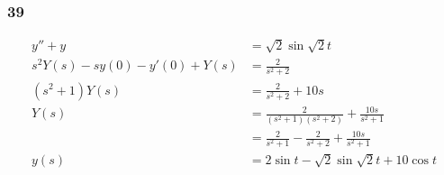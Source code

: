 \documentclass{article}
\begin{document}
\subsubsection{39}

\begin{align*}
  y'' + y                          & = \sqrt{2} \sin \sqrt{2} t                                     \\
  s^2 Y(s) - s y(0) - y'(0) + Y(s) & = \frac{2}{s^2 + 2}                                            \\
  (s^2 + 1) Y(s)                   & = \frac{2}{s^2 + 2} + 10 s                                     \\
  Y(s)                             & = \frac{2}{(s^2 + 1) (s^2 + 2)} + \frac{10 s}{s^2 + 1}         \\
                                   & = \frac{2}{s^2 + 1} - \frac{2}{s^2 + 2} + \frac{10 s}{s^2 + 1} \\
  y(s)                             & = 2 \sin t - \sqrt{2} \sin \sqrt{2} t + 10 \cos t
\end{align*}
\end{document}
